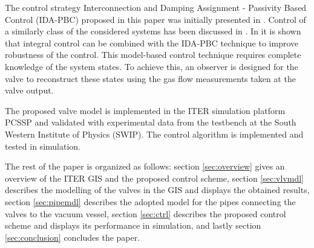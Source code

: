 \documentclass[letterpaper, 10pt, conference]{ieeeconf}
\begin{document}
The control strategy Interconnection and Damping Assignment - Passivity Based Control (IDA-PBC) proposed in this paper was initially presented in \cite{IDAPBC}. Control of a similarly class of the considered systems has been discussed in \cite{PHintro, weakcouple}. 
In \cite{integralIDA} it is shown that integral control can be combined with the IDA-PBC technique to improve robustness of the control. 
This model-based control technique requires complete knowledge of the system states. To achieve this, an observer is designed for the valve to reconstruct these states using the gas flow measurements taken at the valve output.

The proposed valve model is implemented in the ITER simulation platform PCSSP \cite{Ravensbergen2023} and validated with experimental data from the testbench at the South Western Institute of Physics (SWIP). The control algorithm is implemented and tested in simulation.
 
The rest of the paper is organized as follows: section \ref{sec:overview} gives an overview of the ITER GIS and the proposed control scheme, section \ref{sec:vlvmdl} describes the modelling of the valves in the GIS and displays the obtained results, section \ref{sec:pipemdl} describes the adopted model for the pipes connecting the valves to the vacuum vessel, section \ref{sec:ctrl} describes the proposed control scheme and displays its performance in simulation, and lastly section \ref{sec:conclusion} concludes the paper.
\end{document}
